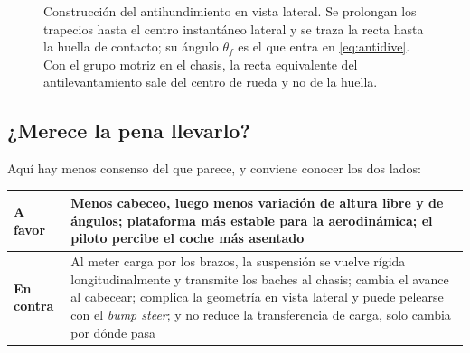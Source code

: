 \begin{figure}[htbp]
\centering
{}
\caption[Construcción del antihundimiento]{Construcción del antihundimiento en
vista lateral. Se prolongan los trapecios hasta el centro instantáneo lateral y
se traza la recta hasta la huella de contacto; su ángulo $\theta_f$ es el que
entra en \eqref{eq:antidive}. Con el grupo motriz en el chasis, la recta
equivalente del antilevantamiento sale del centro de rueda y no de la huella.}
\label{fig:cinematica:antidive}
\end{figure}

\subsection{¿Merece la pena llevarlo?}

Aquí hay menos consenso del que parece, y conviene conocer los dos lados:

\begin{center}
\begin{tabularx}{\textwidth}{@{}lX@{}}
\toprule
\textbf{A favor} & Menos cabeceo, luego menos variación de altura libre y de
  ángulos; plataforma más estable para la aerodinámica; el piloto percibe el
  coche más asentado \\
\midrule
\textbf{En contra} & Al meter carga por los brazos, la suspensión se vuelve
  rígida longitudinalmente y transmite los baches al chasis; cambia el avance
  al cabecear; complica la geometría en vista lateral y puede pelearse con el
  \emph{bump steer}; y no reduce la transferencia de carga, solo cambia por
  dónde pasa \\
\bottomrule
\end{tabularx}
\end{center}


